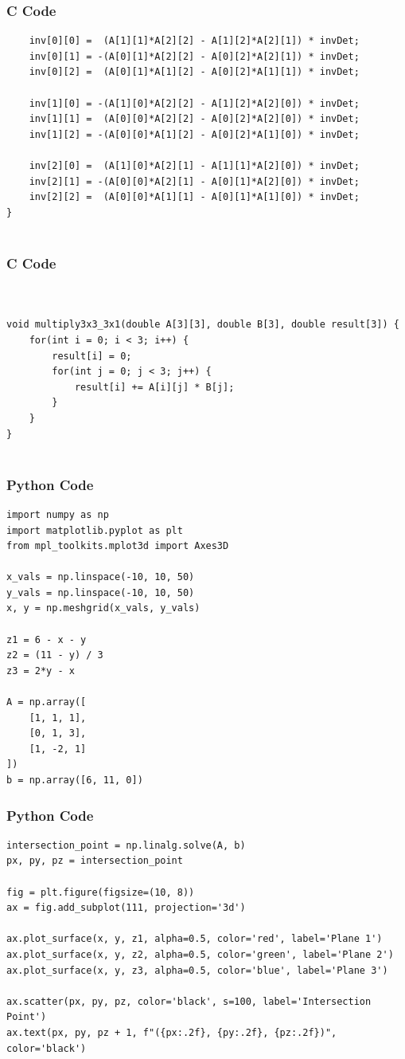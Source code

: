 \documentclass{beamer}
\begin{document}
\begin{frame}[fragile]
    \frametitle{C Code}
    \begin{lstlisting}
    inv[0][0] =  (A[1][1]*A[2][2] - A[1][2]*A[2][1]) * invDet;
    inv[0][1] = -(A[0][1]*A[2][2] - A[0][2]*A[2][1]) * invDet;
    inv[0][2] =  (A[0][1]*A[1][2] - A[0][2]*A[1][1]) * invDet;

    inv[1][0] = -(A[1][0]*A[2][2] - A[1][2]*A[2][0]) * invDet;
    inv[1][1] =  (A[0][0]*A[2][2] - A[0][2]*A[2][0]) * invDet;
    inv[1][2] = -(A[0][0]*A[1][2] - A[0][2]*A[1][0]) * invDet;

    inv[2][0] =  (A[1][0]*A[2][1] - A[1][1]*A[2][0]) * invDet;
    inv[2][1] = -(A[0][0]*A[2][1] - A[0][1]*A[2][0]) * invDet;
    inv[2][2] =  (A[0][0]*A[1][1] - A[0][1]*A[1][0]) * invDet;
}
   
    \end{lstlisting}
\end{frame}
\begin{frame}[fragile]
    \frametitle{C Code}
    \begin{lstlisting}


void multiply3x3_3x1(double A[3][3], double B[3], double result[3]) {
    for(int i = 0; i < 3; i++) {
        result[i] = 0;
        for(int j = 0; j < 3; j++) {
            result[i] += A[i][j] * B[j];
        }
    }
}
   
    \end{lstlisting}
\end{frame}

\begin{frame}[fragile]
    \frametitle{Python Code}
    \begin{lstlisting}
import numpy as np
import matplotlib.pyplot as plt
from mpl_toolkits.mplot3d import Axes3D

x_vals = np.linspace(-10, 10, 50)
y_vals = np.linspace(-10, 10, 50)
x, y = np.meshgrid(x_vals, y_vals)

z1 = 6 - x - y
z2 = (11 - y) / 3
z3 = 2*y - x

A = np.array([
    [1, 1, 1],
    [0, 1, 3],
    [1, -2, 1]
])
b = np.array([6, 11, 0])

    \end{lstlisting}
\end{frame}

\begin{frame}[fragile]
    \frametitle{Python Code}
    \begin{lstlisting}
intersection_point = np.linalg.solve(A, b)
px, py, pz = intersection_point

fig = plt.figure(figsize=(10, 8))
ax = fig.add_subplot(111, projection='3d')

ax.plot_surface(x, y, z1, alpha=0.5, color='red', label='Plane 1')
ax.plot_surface(x, y, z2, alpha=0.5, color='green', label='Plane 2')
ax.plot_surface(x, y, z3, alpha=0.5, color='blue', label='Plane 3')

ax.scatter(px, py, pz, color='black', s=100, label='Intersection Point')
ax.text(px, py, pz + 1, f"({px:.2f}, {py:.2f}, {pz:.2f})", color='black')
   
    \end{lstlisting}
\end{frame}
\end{document}
